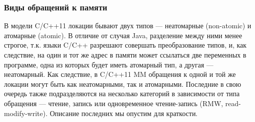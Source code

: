 \subsubsection{Виды обращений к памяти}
В модели C/C++11 локации бывают двух типов --- неатомарные (non-atomic) и атомарные (atomic).
В отличие от случая Java, разделение между ними менее строгое,
т.к. языки C/C++ разрешают совершать преобразование типов, и, как следствие,
на один и тот же адрес в памяти может ссылаться две переменных в программе, одна из которых будет
иметь атомарный тип, а другая --- неатомарный.
Как следствие, в C/C++11 MM обращения к одной и той же локации могут быть как неатомарными, так и атомарными.
Последние в свою очередь также подразделяются на несколько категорий в зависимости от типа обращения ---
чтение, запись или одновременное чтение-запись (RMW, read-modify-write).
Описание последних мы опустим для краткости.


